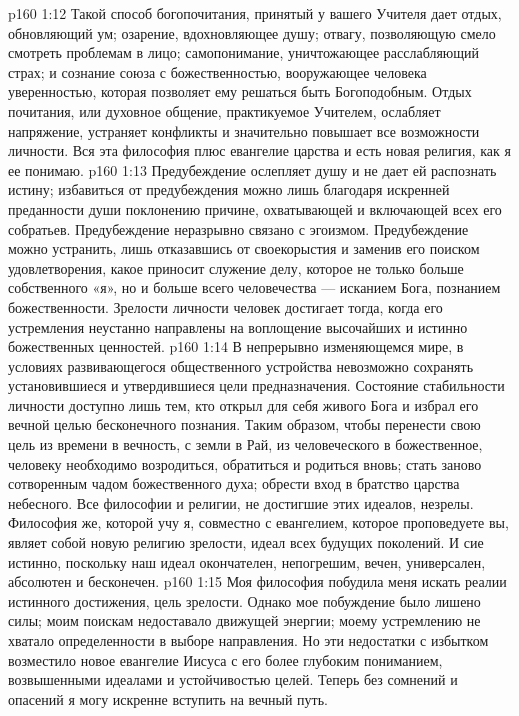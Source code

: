 \vs p160 1:12 Такой способ богопочитания, принятый у вашего Учителя дает отдых, обновляющий ум; озарение, вдохновляющее душу; отвагу, позволяющую смело смотреть проблемам в лицо; самопонимание, уничтожающее расслабляющий страх; и сознание союза с божественностью, вооружающее человека уверенностью, которая позволяет ему решаться быть Богоподобным. Отдых почитания, или духовное общение, практикуемое Учителем, ослабляет напряжение, устраняет конфликты и значительно повышает все возможности личности. Вся эта философия плюс евангелие царства и есть новая религия, как я ее понимаю.
\vs p160 1:13 \pc Предубеждение ослепляет душу и не дает ей распознать истину; избавиться от предубеждения можно лишь благодаря искренней преданности души поклонению причине, охватывающей и включающей всех его собратьев. Предубеждение неразрывно связано с эгоизмом. Предубеждение можно устранить, лишь отказавшись от своекорыстия и заменив его поиском удовлетворения, какое приносит служение делу, которое не только больше собственного «я», но и больше всего человечества --- исканием Бога, познанием божественности. Зрелости личности человек достигает тогда, когда его устремления неустанно направлены на воплощение высочайших и истинно божественных ценностей.
\vs p160 1:14 В непрерывно изменяющемся мире, в условиях развивающегося общественного устройства невозможно сохранять установившиеся и утвердившиеся цели предназначения. Состояние стабильности личности доступно лишь тем, кто открыл для себя живого Бога и избрал его вечной целью бесконечного познания. Таким образом, чтобы перенести свою цель из времени в вечность, с земли в Рай, из человеческого в божественное, человеку необходимо возродиться, обратиться и родиться вновь; стать заново сотворенным чадом божественного духа; обрести вход в братство царства небесного. Все философии и религии, не достигшие этих идеалов, незрелы. Философия же, которой учу я, совместно с евангелием, которое проповедуете вы, являет собой новую религию зрелости, идеал всех будущих поколений. И сие истинно, поскольку наш идеал окончателен, непогрешим, вечен, универсален, абсолютен и бесконечен.
\vs p160 1:15 Моя философия побудила меня искать реалии истинного достижения, цель зрелости. Однако мое побуждение было лишено силы; моим поискам недоставало движущей энергии; моему устремлению не хватало определенности в выборе направления. Но эти недостатки с избытком возместило новое евангелие Иисуса с его более глубоким пониманием, возвышенными идеалами и устойчивостью целей. Теперь без сомнений и опасений я могу искренне вступить на вечный путь.
